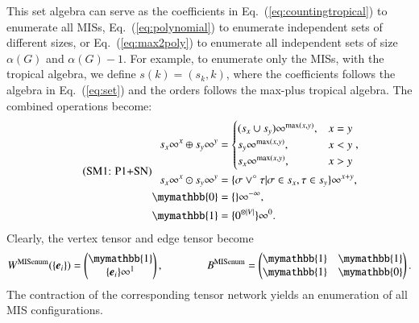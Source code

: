 \documentclass[onefignum, onetabnum]{siamart190516}
\newcommand{\eqname}[1]{\stepcounter{equation}\tag{\theequation : #1}}
\newcommand{\<}{\langle}
\renewcommand{\>}{\rangle}
\newcommand{\Eq}[1]{Eq.~(\ref{#1})}
\newcounter{example}
\begin{document}
This set algebra can serve as the coefficients in \Eq{eq:countingtropical} to enumerate all MISs, \Eq{eq:polynomial} to enumerate independent sets of different sizes,
or \Eq{eq:max2poly} to enumerate all independent sets of size $\alpha(G)$ and $\alpha(G)-1$.
For example, to enumerate only the MISs, with the tropical algebra, we define $s(k) = (s_{k}, k)$, where the coefficients follows the algebra in \Eq{eq:set} and the orders follows the max-plus tropical algebra.
The combined operations become: 
\begin{equation}
\eqname{P1+SN}
\begin{split}
    s_x\infty^x \oplus s_y\infty^y &= \begin{cases}
        (s_x \cup s_y)\infty^{\max(x,y)}, & x = y\\
        s_y\infty^{\max(x,y)}, & x < y\\
        s_x\infty^{\max(x,y)}, & x > y
    \end{cases},\\
    s_x\infty^x \odot s_y\infty^y &= \{\sigma \lor^\circ \tau | \sigma \in s_x, \tau \in s_y\}\infty^{x+y},\\
    \mymathbb{0} &= \{\}\infty^{-\infty},\\
    \mymathbb{1} &= \{0^{\otimes |V|}\}\infty^{0}. \label{eq:countingtropicalset}
\end{split}
\end{equation}
Clearly, the vertex tensor and edge tensor become
\begin{equation}
    W^{\rm MISenum}(\{\boldsymbol{e}_{i}\}) = \left(\begin{matrix}
        \mymathbb{1} \\
        \{\boldsymbol{e}_{i}\}\infty^1
    \end{matrix}\right),   
    \qquad \qquad
        B^{\rm MISenum} = \left(\begin{matrix}
        \mymathbb{1}  & \mymathbb{1} \\
        \mymathbb{1} & \mymathbb{0}
    \end{matrix}\right).
\end{equation}
The contraction of the corresponding tensor network yields an enumeration of all MIS configurations.
\end{document}
